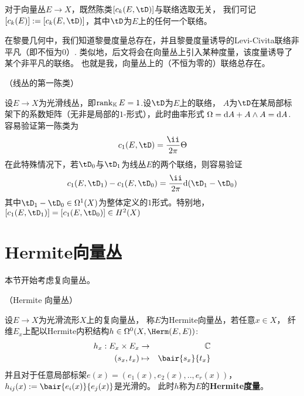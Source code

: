 \begin{rem}
对于向量丛$E\to X$，既然陈类$[c_k(E,\tD)]$与联络选取无关，
我们可记$[c_k(E)]:=[c_k(E,\tD)]$，其中$\tD$为$E$上的任何一个联络。
\end{rem}
在黎曼几何中，我们知道黎曼度量总存在，并且黎曼度量诱导的Levi-Civita联络非平凡（即不恒为$0$）.
类似地，后文将会在向量丛上引入某种度量，该度量诱导了某个非平凡的联络。
也就是我，向量丛上的（不恒为零的）联络总存在。

\begin{example}（线丛的第一陈类）

设$E\to X$为光滑线丛，即$\operatorname{rank}_{\mathbb{K}}E=1$.设$\tD$为$E$上的联络，
$A$为$\tD$在某局部标架下的系数矩阵（无非是局部的$1$-形式），此时曲率形式
$\Omega=\mathrm{d} A+A\wedge A=\mathrm{d} A$.
容易验证第一陈类为
$$c_1(E,\tD)=\frac{\ii}{2\pi}\Theta$$
在此特殊情况下，若$\tD_0$与$\tD_1$为线丛$E$的两个联络，则容易验证
$$
  c_1(E,\tD_1)-c_1(E,\tD_0)
=
  \frac{\ii}{2\pi}\td(\tD_1-\tD_0)
$$
其中$\tD_1-\tD_0\in\Omg^1(X)$为整体定义的$1$形式。特别地，
$[c_1(E,\tD_1)]=[c_1(E,\tD_0)]\in H^2(X)$
\end{example}


\section{Hermite向量丛}
本节开始考虑复向量丛。

\begin{definition}（Hermite 向量丛）

设$E\to X$为光滑流形$X$上的复向量丛，
称$E$为Hermite向量丛，若任意$x\in X$，
纤维$E_x$上配以Hermite内积结构$h\in\Omg^0(X,\Herm(E,E))$:
\begin{eqnarray*}
  h_x:E_x\times E_x&\to&\bbC\\
  (s_x,t_x)&\mapsto&\bair{s_x}{t_x}
\end{eqnarray*}
并且对于任意局部标架$e(x)=(e_1(x),e_2(x),..,e_r(x))$，
$h_{ij}(x):=\bair{e_i(x)}{e_j(x)}$是光滑的。
此时$h$称为$E$的\textbf{Hermite度量}。
\end{definition}

